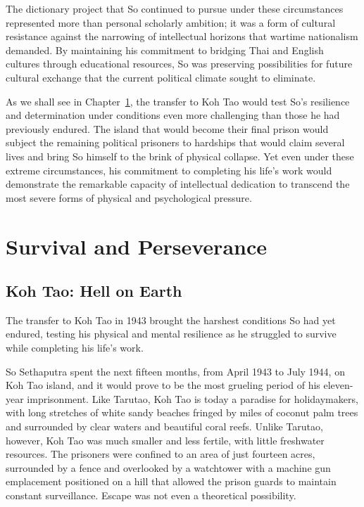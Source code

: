 \documentclass[
  Letterpaper,
]{scrbook}
\begin{document}
The dictionary project that So continued to pursue under these
circumstances represented more than personal scholarly ambition; it was
a form of cultural resistance against the narrowing of intellectual
horizons that wartime nationalism demanded. By maintaining his
commitment to bridging Thai and English cultures through educational
resources, So was preserving possibilities for future cultural exchange
that the current political climate sought to eliminate.

As we shall see in Chapter~\ref{sec-survival-perseverance}, the transfer
to Koh Tao would test So's resilience and determination under conditions
even more challenging than those he had previously endured. The island
that would become their final prison would subject the remaining
political prisoners to hardships that would claim several lives and
bring So himself to the brink of physical collapse. Yet even under these
extreme circumstances, his commitment to completing his life's work
would demonstrate the remarkable capacity of intellectual dedication to
transcend the most severe forms of physical and psychological pressure.


\chapter{Survival and Perseverance}\label{sec-survival-perseverance}

\section{Koh Tao: Hell on Earth}\label{koh-tao-hell-on-earth}

The transfer to Koh Tao in 1943 brought the harshest conditions So had
yet endured, testing his physical and mental resilience as he struggled
to survive while completing his life's work.

So Sethaputra spent the next fifteen months, from April 1943 to July
1944, on Koh Tao island, and it would prove to be the most grueling
period of his eleven-year imprisonment. Like Tarutao, Koh Tao is today a
paradise for holidaymakers, with long stretches of white sandy beaches
fringed by miles of coconut palm trees and surrounded by clear waters
and beautiful coral reefs. Unlike Tarutao, however, Koh Tao was much
smaller and less fertile, with little freshwater resources. The
prisoners were confined to an area of just fourteen acres, surrounded by
a fence and overlooked by a watchtower with a machine gun emplacement
positioned on a hill that allowed the prison guards to maintain constant
surveillance. Escape was not even a theoretical possibility.
\end{document}
